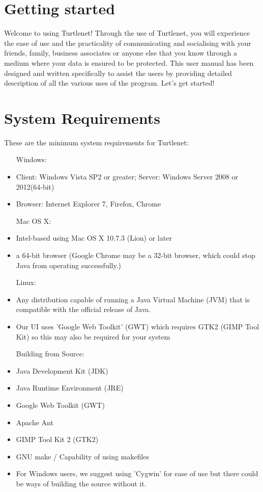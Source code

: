 \section{Getting started}
Welcome to using Turtlenet!  Through the use of Turtlenet, you will experience
the ease of use and the practicality of communicating and socialising with your
friends, family, business associates or anyone else that you know through a
medium where your data is ensured to be protected.  This user manual has been
designed and written specifically to assist the users by providing detailed
description of all the various uses of the program.  Let's get started!

\section{System Requirements}
These are the minimum system requirements for Turtlenet:
\begin{itemize}
\item[Windows:]
\item Client: Windows Vista SP2 or greater; Server: Windows Server 2008 or 
      2012(64-bit)
\item Browser: Internet Explorer 7, Firefox, Chrome

\item[Mac OS X:]
\item Intel-based using Mac OS X 10.7.3 (Lion) or later
\item a 64-bit browser (Google Chrome may be a 32-bit browser, which could stop
                        Java from operating successfully.)
                        
\item[Linux:]
\item Any distribution capable of running a Java Virtual Machine (JVM) that is
      compatible with the official release of Java.
\item Our UI uses 'Google Web Toolkit' (GWT) which requires GTK2 (GIMP Tool Kit)
      so this may also be required for your system
      
\item[Building from Source:]
\item Java Development Kit (JDK)
\item Java Runtime Environment (JRE)
\item Google Web Toolkit (GWT)
\item Apache Ant
\item GIMP Tool Kit 2 (GTK2)
\item GNU make / Capability of using makefiles
\item For Windows users, we suggest using 'Cygwin' for ease of use but there
      could be ways of building the source without it.
\end{itemize}


